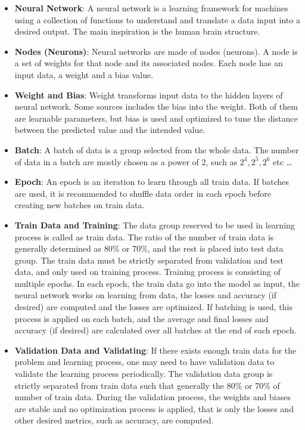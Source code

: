\begin{itemize}
	
	\item \textbf{Neural Network}: A neural network is a learning framework for machines using a collection of functions to understand and translate a data input into a desired output. The main inspiration is the human brain structure.
	
	\item \textbf{Nodes (Neurons)}: Neural networks are made of nodes (neurons). A node is a set of weights for that node and its associated nodes. Each node has an input data, a weight and a bias value.
	
	\item \textbf{Weight and Bias}: Weight transforms input data to the hidden layers of neural network. Some sources includes the bias into the weight. Both of them are learnable parameters, but bias is used and optimized to tune the distance between the predicted value and the intended value.
	
	\item \textbf{Batch}: A batch of data is a group selected from the whole data. The number of data in a batch are mostly chosen as a power of 2, such as $2^4, 2^5, 2^6$ etc \dots
	
	\item \textbf{Epoch}: An epoch is an iteration to learn through all train data. If batches are used, it is recommended to shuffle data order in each epoch before creating new batches on train data.
	
	\item \textbf{Train Data and Training}: The data group reserved to be used in learning process is called as train data. The ratio of the number of train data is generally determined as 80\% or 70\%, and the rest is placed into test data group. The train data must be strictly separated from validation and test data, and only used on training process. Training process is consisting of multiple epochs. In each epoch, the train data go into the model as input, the neural network works on learning from data, the losses and accuracy (if desired) are computed and the losses are optimized. If batching is used, this process is applied on each batch, and the average and final losses and accuracy (if desired) are calculated over all batches at the end of each epoch.
	
	\item \textbf{Validation Data and Validating}: If there exists enough train data for the problem and learning process, one may need to have validation data to validate the learning process periodically. The validation data group is strictly separated from train data such that generally the 80\% or 70\% of number of train data. During the validation process, the weights and biases are stable and no optimization process is applied, that is only the losses and other desired metrics, such as accuracy, are computed.
	

\end{itemize}
